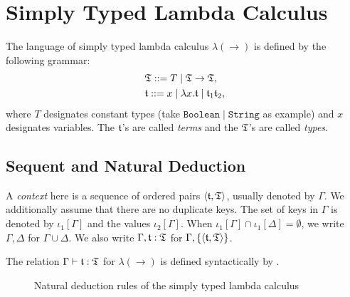 \section{Simply Typed Lambda Calculus}

The language of simply typed lambda calculus $\lambda(\rightarrow)$ is defined by the following grammar:
\begin{align*}
    &\mathfrak{T} ::= T \mid \mathfrak{T} \rightarrow \mathfrak{T}, \\
    &\mathfrak{t} ::= x \mid \lambda x. \mathfrak{t} \mid \mathfrak{t}_1 \mathfrak{t}_2,
\end{align*}
where $T$ designates constant types (take $\mathtt{Boolean} \mid \mathtt{String}$ as example) and $x$ designates variables. The $\mathfrak{t}$'s are called \textit{terms} and the $\mathfrak{T}$'s are called \textit{types}.

\subsection{Sequent and Natural Deduction}

A \textit{context} here is a sequence of ordered pairs $\left\langle \mathfrak{t}, \mathfrak{T} \right\rangle$, usually denoted by $\Gamma$. We additionally assume that there are no duplicate keys. The set of keys in $\Gamma$ is denoted by $\iota_1[\Gamma]$ and the values $\iota_2[\Gamma]$. When $\iota_1[\Gamma] \cap \iota_1[\Delta] = \emptyset$, we write $\Gamma, \Delta$ for $\Gamma \cup \Delta$. We also write $\Gamma, \mathfrak{t}: \mathfrak{T}$ for $\Gamma, \{\left\langle \mathfrak{t}, \mathfrak{T} \right\rangle\}$.

\begin{definition}
The relation $\Gamma \vdash \mathfrak{t} : \mathfrak{T}$ for $\lambda(\rightarrow)$ is defined syntactically by .
\end{definition}

\begin{figure}
    \centering
    
    \caption{Natural deduction rules of the simply typed lambda calculus}
    \label{fig:simply-typed-lambda-calculus-natural-deduction}
\end{figure}
